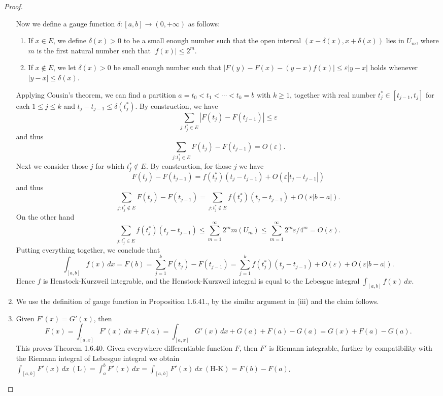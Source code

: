 \documentclass[a4paper]{article}
\begin{document}
\begin{proof}
\begin{enumerate}[label = (\roman*)]
    Now we define a gauge function $\delta: [a, b] \to (0, +\infty)$ as follows:\begin{enumerate}[label = (\alph*)]
        \item If $x \in E$, we define $\delta(x) > 0$ to be a small enough number such that the open interval 
        $(x - \delta(x), x + \delta(x))$ lies in $U_m$, where $m$ is the first natural number such that $|f(x)| \leq 2^m$.
        \item If $x \not\in E$, we let $\delta(x) > 0$ be small enough number such that $|F(y) - F(x) - (y - x)f(x)| \leq \varepsilon |y - x|$
        holds whenever $|y - x| \leq \delta(x)$.
    \end{enumerate}
    Applying Cousin's theorem, we can find a partition $a = t_0 < t_1 < \cdots < t_k =  b$ with $k \geq 1$, together
    with real number $t_j^* \in [t_{j - 1}, t_j]$ for each $1 \leq j \leq k$ and $t_j - t_{j - 1} \leq \delta(t_j^*)$.
    By construction, we have $$
    \sum_{j: t_j^* \in E} |F(t_j) - F(t_{j - 1})| \leq \varepsilon
    $$and thus $$
    \sum_{j: t_j^* \in E} F(t_j) - F(t_{j - 1}) = O(\varepsilon).
    $$Next we consider those $j$ for which $t_j^* \not\in E$. By construction, for those $j$ we have $$
    F(t_j) - F(t_{j - 1}) = f(t_j^*)(t_j - t_{j - 1}) + O(\varepsilon |t_j - t_{j - 1}|)
    $$and thus $$
    \sum_{j: t_j^* \not\in E} F(t_j) - F(t_{j - 1}) = \sum_{j: t_j^* \not\in E} f(t_j^*)(t_j - t_{j - 1}) + O(\varepsilon|b - a|).
    $$On the other hand$$
    \sum_{j: t_j^* \in E} f(t_j^*)(t_j - t_{j - 1}) \leq \sum_{m = 1}^\infty 2^m m(U_m) \leq \sum_{m = 1}^\infty
    2^m\varepsilon/4^m = O(\varepsilon).
    $$Putting everything together, we conclude that$$
    \int_{[a, b]} f(x)\,dx = F(b) = \sum_{j = 1}^k F(t_j) - F(t_{j - 1}) = \sum_{j = 1}^k f(t_j^*)(t_j - t_{j - 1})
    + O(\varepsilon) + O(\varepsilon |b - a|).
    $$Hence $f$ is Henstock-Kurzweil integrable, and the Henstock-Kurzweil integral is equal to the
    Lebesgue integral $\int_{[a, b]} f(x)\,dx$.
    \item We use the definition of gauge function in Proposition 1.6.41., by the similar argument in (iii) and the claim follows.
    \item Given $F'(x) = G'(x)$, then \[
        F(x) = \int_{[a,x]} F'(x)\,dx + F(a) = \int_{[a,x]} G'(x)\,dx + G(a) + F(a) - G(a) = G(x) + F(a) - G(a).
        \]This proves Theorem 1.6.40. Given everywhere differentiable function $F$, then $F'$ is Riemann integrable, 
        further by compatibility with the Riemann integral of Lebesgue integral we obtain 
        $\int_{[a,b]}F'(x)\,dx\ (\mathrm{L}) = \int_a^b F'(x)\,dx = \int_{[a,b]} F'(x)\,dx\ (\mathrm{H}\text{-}\mathrm{K}) = F(b) - F(a)$.
        \qedhere
\end{enumerate}
\end{proof}
\end{document}

